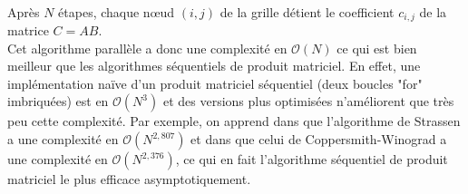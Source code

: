 \paragraph{} Après $N$ étapes, chaque nœud $(i,j)$ de la grille détient le coefficient $c_{i,j}$ de la matrice $C = AB$.\\


Cet algorithme parallèle a donc une complexité en $\mathcal{O}(N)$ ce qui est bien meilleur que les algorithmes séquentiels de produit matriciel. En effet, une implémentation naïve d'un produit matriciel séquentiel (deux boucles "for" imbriquées) est en $\mathcal{O}(N^3)$ et des versions plus optimisées n'améliorent que très peu cette complexité. Par exemple, on apprend dans \cite{wiki:Strassen} que l'algorithme de Strassen a une complexité en $\mathcal{O}(N^{2,807})$ et dans \cite{wiki:Coppersmith-Winograd} que celui de Coppersmith-Winograd a une complexité en $\mathcal{O}(N^{2,376})$, ce qui en fait l'algorithme séquentiel de produit matriciel le plus efficace asymptotiquement.